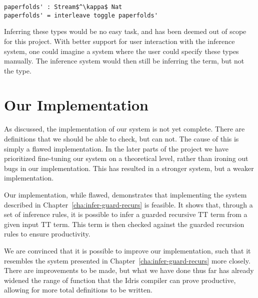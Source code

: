 \begin{lstlisting}[mathescape, title=\idrisBlock]
paperfolds' : Stream$^\kappa$ Nat
paperfolds' = interleave toggle paperfolds'
\end{lstlisting}

Inferring these types would be no easy task, and has been deemed out of scope for
this project. With better support for user interaction with the
inference system, one could imagine a system where the user could specify these
types manually. The inference system would then still be
inferring the term, but not the type.




\section{Our Implementation}
\label{sec:our-implementation}
As discussed, the implementation of our system is not yet complete. There are
definitions that we should be able to check, but can not. The cause of this is
simply a flawed implementation. In the later parts of the project we have
prioritized fine-tuning our system on a theoretical level, rather than ironing
out bugs in our implementation. This has resulted in a stronger system, but a
weaker implementation.

Our implementation, while flawed, demonstrates that implementing the system
described in Chapter~\ref{cha:infer-guard-recurs} is feasible. It shows that,
through a set of inference rules, it is possible to infer a guarded recursive TT
term from a given input TT term. This term is then checked against the guarded
recursion rules to ensure productivity.

We are convinced that it is possible to improve our implementation, such that it
resembles the system presented in Chapter~\ref{cha:infer-guard-recurs} more
closely. There are improvements to be made, but what we have done
thus far has already widened the range of function that the Idris compiler can
prove productive, allowing for
more total definitions to be written.
